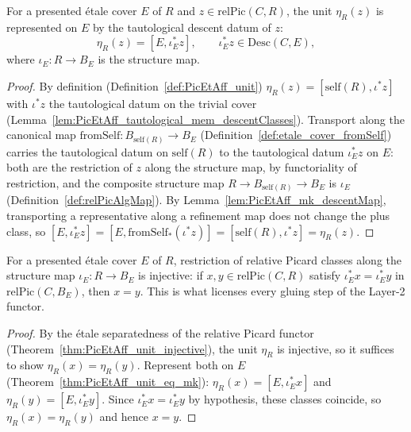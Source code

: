 \begin{theorem}
  \label{thm:PicEtAff_unit_eq_mk}
  \leanok
  For a presented \'etale cover \(E\) of \(R\) and \(z \in \mathrm{relPic}(C, R)\), the unit
  \(\eta_R(z)\) is represented on \(E\) by the tautological descent datum of \(z\):
  \[
    \eta_R(z) = [E, \iota_E^{*}z], \qquad \iota_E^{*}z \in \mathrm{Desc}(C, E),
  \]
  where \(\iota_E \colon R \to B_E\) is the structure map.
\end{theorem}
\begin{proof}
  \leanok
  By definition (Definition~\ref{def:PicEtAff_unit}) \(\eta_R(z) = [\mathrm{self}(R), \iota^{*}z]\)
  with \(\iota^{*}z\) the tautological datum on the trivial cover
  (Lemma~\ref{lem:PicEtAff_tautological_mem_descentClasses}). Transport along the canonical map
  \(\mathrm{fromSelf} \colon B_{\mathrm{self}(R)} \to B_E\) (Definition~\ref{def:etale_cover_fromSelf})
  carries the tautological datum on \(\mathrm{self}(R)\) to the tautological datum
  \(\iota_E^{*}z\) on \(E\): both are the restriction of \(z\) along the structure map, by
  functoriality of restriction, and the composite structure map \(R \to B_{\mathrm{self}(R)} \to
  B_E\) is \(\iota_E\) (Definition~\ref{def:relPicAlgMap}). By
  Lemma~\ref{lem:PicEtAff_mk_descentMap}, transporting a representative along a refinement map does
  not change the plus class, so \([E, \iota_E^{*}z] = [E, \mathrm{fromSelf}_{*}(\iota^{*}z)] =
  [\mathrm{self}(R), \iota^{*}z] = \eta_R(z)\).
\end{proof}

\begin{theorem}
  \label{thm:relPicAlgMap_injective_of_etaleCover}
  \leanok
  For a presented \'etale cover \(E\) of \(R\), restriction of relative Picard classes along the
  structure map \(\iota_E \colon R \to B_E\) is injective: if \(x, y \in \mathrm{relPic}(C, R)\)
  satisfy \(\iota_E^{*}x = \iota_E^{*}y\) in \(\mathrm{relPic}(C, B_E)\), then \(x = y\). This is
  what licenses every gluing step of the Layer-2 functor.
\end{theorem}
\begin{proof}
  \leanok
  By the \'etale separatedness of the relative Picard functor
  (Theorem~\ref{thm:PicEtAff_unit_injective}), the unit \(\eta_R\) is injective, so it suffices to
  show \(\eta_R(x) = \eta_R(y)\). Represent both on \(E\) (Theorem~\ref{thm:PicEtAff_unit_eq_mk}):
  \(\eta_R(x) = [E, \iota_E^{*}x]\) and \(\eta_R(y) = [E, \iota_E^{*}y]\). Since \(\iota_E^{*}x =
  \iota_E^{*}y\) by hypothesis, these classes coincide, so \(\eta_R(x) = \eta_R(y)\) and hence
  \(x = y\).
\end{proof}

